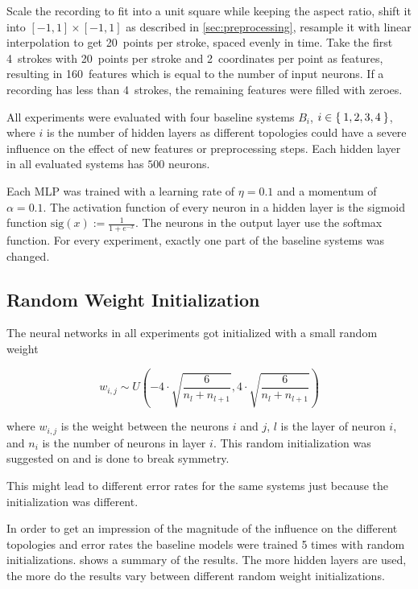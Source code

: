 \documentclass[9pt,technote]{IEEEtran}
\begin{document}
Scale the recording to fit into a unit square while keeping the aspect ratio,
shift it into $[-1,1] \times [-1,1]$ as described in \cref{sec:preprocessing},
resample it with linear interpolation to get 20~points per stroke, spaced
evenly in time. Take the first 4~strokes with 20~points per stroke and
2~coordinates per point as features, resulting in 160~features which is equal
to the number of input neurons. If a recording has less than 4~strokes, the
remaining features were filled with zeroes.

All experiments were evaluated with four baseline systems $B_i$, $i \in \Set{1,
2, 3, 4}$, where $i$ is the number of hidden layers as different topologies
could have a severe influence on the effect of new features or preprocessing
steps. Each hidden layer in all evaluated systems has $500$ neurons.

Each \gls{MLP} was trained with a learning rate of $\eta = 0.1$ and a momentum
of $\alpha = 0.1$. The activation function of every neuron in a hidden layer is
the sigmoid function $\text{sig}(x) := \frac{1}{1+e^{-x}}$. The neurons in the
output layer use the softmax function. For every experiment, exactly one part
of the baseline systems was changed.

\subsection{Random Weight Initialization}
The neural networks in all experiments got initialized with a small random
weight

\[w_{i,j} \sim U(-4 \cdot \sqrt{\frac{6}{n_l + n_{l+1}}}, 4 \cdot \sqrt{\frac{6}{n_l + n_{l+1}}})\]

where $w_{i,j}$ is the weight between the neurons $i$ and $j$, $l$ is the layer
of neuron $i$, and $n_i$ is the number of neurons in layer $i$. This random
initialization was suggested on
\cite{deeplearningweights} and is done to break symmetry.

This might lead to different error rates for the same systems just because the
initialization was different.

In order to get an impression of the magnitude of the influence on the different
topologies and error rates the baseline models were trained 5 times with
random initializations.
shows a summary of the results. The more hidden layers are used, the more do
the results vary between different random weight initializations.
\end{document}
